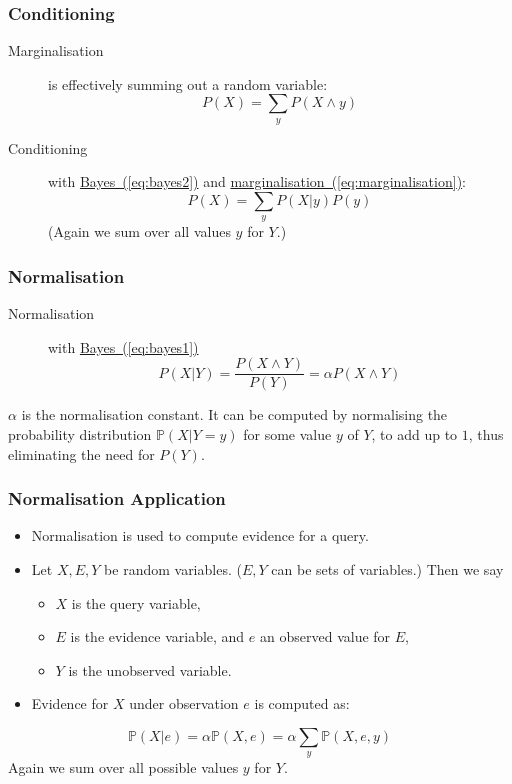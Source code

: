 \documentclass[xcolor=dvipsnames,ignorenonframetext]{beamer}
\newcommand{\Pb}{\mathbb{P}}
\begin{document}
\begin{frame}
  \frametitle{Conditioning}
  \begin{description}
  \item[Marginalisation] is effectively summing out a random variable:
    \begin{equation}
      \label{eq:marginalisation}
      P(X)=\sum_y P(X\wedge y)  
    \end{equation}
  \item[Conditioning] with \hyperref[eq:bayes2]{Bayes~(\ref{eq:bayes2})} and
    \hyperref[eq:marginalisation]{marginalisation~(\ref{eq:marginalisation})}:
    \begin{equation}
      \label{eq:new1}
      P(X)=\sum_y P(X|y) P(y)
    \end{equation}
    (Again we sum over all values $y$ for $Y$.)
  \end{description}
\end{frame}


\begin{frame}
  \frametitle{Normalisation}
  \begin{description}
  \item[Normalisation] with \hyperref[eq:bayes1]{Bayes~(\ref{eq:bayes1})}
    \begin{equation}
      \label{eq:new3}
      P(X|Y)=\frac{P(X\wedge Y)}{P(Y)}=\alpha P(X\wedge Y)
    \end{equation}
  \end{description}
  $\alpha$ is the normalisation constant. It can be computed by normalising
  the probability distribution $\Pb(X|Y=y)$ for some value $y$ of $Y$, to add
  up to $1$, thus eliminating the need for $P(Y)$.
\end{frame}
  
\begin{frame}
  \frametitle{Normalisation Application}
  \begin{itemize}
  \item 
    Normalisation is used to compute evidence for a query.
  \item Let $X, E, Y$ be random variables. ($E,Y$ can be sets of variables.) Then we say
    \begin{itemize}
    \item $X$ is the query variable,
    \item $E$ is the evidence variable, and $e$ an observed value for $E$,
    \item $Y$ is the unobserved variable. 
    \end{itemize}
  \item Evidence for $X$ under observation $e$ is computed as:
  \end{itemize}
    \[ \Pb(X|e) = \alpha\Pb(X, e)=\alpha\sum_y \Pb(X, e, y)\]
    Again we sum over all possible values $y$ for $Y$.
\end{frame}
\end{document}
